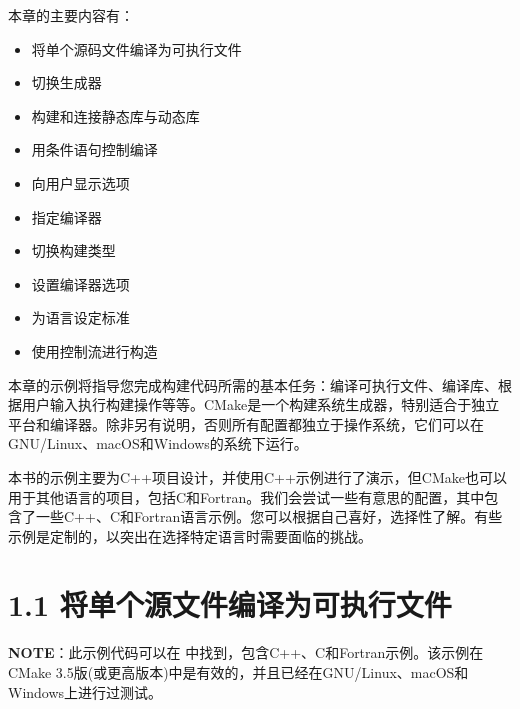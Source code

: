 本章的主要内容有：

\begin{itemize}
\item 将单个源码文件编译为可执行文件

\item 切换生成器

\item 构建和连接静态库与动态库

\item 用条件语句控制编译

\item 向用户显示选项

\item 指定编译器

\item 切换构建类型

\item 设置编译器选项

\item 为语言设定标准

\item 使用控制流进行构造

\end{itemize}

本章的示例将指导您完成构建代码所需的基本任务：编译可执行文件、编译库、根据用户输入执行构建操作等等。CMake是一个构建系统生成器，特别适合于独立平台和编译器。除非另有说明，否则所有配置都独立于操作系统，它们可以在GNU/Linux、macOS和Windows的系统下运行。

本书的示例主要为C++项目设计，并使用C++示例进行了演示，但CMake也可以用于其他语言的项目，包括C和Fortran。我们会尝试一些有意思的配置，其中包含了一些C++、C和Fortran语言示例。您可以根据自己喜好，选择性了解。有些示例是定制的，以突出在选择特定语言时需要面临的挑战。


\section{1.1 将单个源文件编译为可执行文件}

\begin{myInfoBox}
\textbf{NOTE}：此示例代码可以在  中找到，包含C++、C和Fortran示例。该示例在CMake 3.5版(或更高版本)中是有效的，并且已经在GNU/Linux、macOS和Windows上进行过测试。
\end{myInfoBox}

